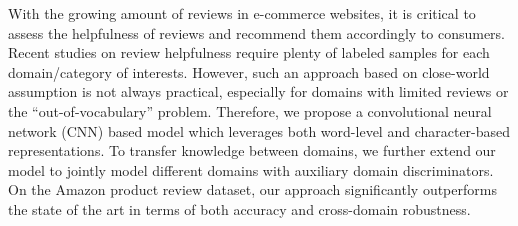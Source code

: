 With the growing amount of reviews in e-commerce websites, it is critical to assess the helpfulness of reviews and recommend them accordingly to consumers. Recent studies on review helpfulness require plenty of labeled samples for each domain/category of interests. However, such an approach based on close-world assumption is not always practical, especially for domains with limited reviews or the ``out-of-vocabulary'' problem. Therefore, we propose a convolutional neural network (CNN) based model which leverages both word-level and character-based representations. To transfer knowledge between domains, we further extend our model to jointly model different domains with auxiliary domain discriminators. On the Amazon product review dataset, our approach significantly outperforms the state of the art in terms of both accuracy and cross-domain robustness.
